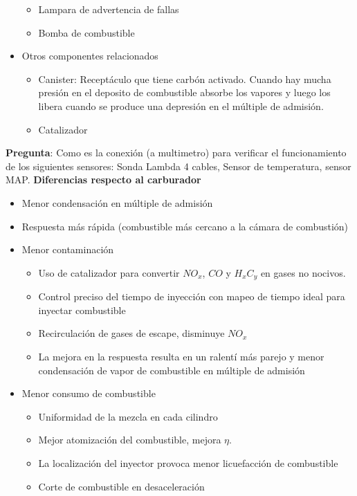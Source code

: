 \begin{itemize}
\begin{itemize}
   \item Lampara de advertencia de fallas
   \item Bomba de combustible
   \end{itemize}
   \item Otros componentes relacionados
   \begin{itemize}
          \item Canister: Receptáculo que tiene carbón activado. Cuando hay mucha presión en el deposito de combustible absorbe los vapores y luego los libera cuando se produce una depresión en el múltiple de admisión.
          \item Catalizador
   \end{itemize}
\end{itemize}

\textbf{Pregunta}: Como es la conexión (a multimetro) para verificar el funcionamiento de los siguientes sensores: Sonda Lambda 4 cables, Sensor de temperatura, sensor MAP.
{\bf Diferencias respecto al carburador}

\begin{itemize}
    \item Menor condensación en múltiple de admisión
    \item Respuesta más rápida (combustible más cercano a la cámara de combustión)
    \item Menor contaminación
    \begin{itemize}
        \item Uso de catalizador para convertir $NO_x$, $CO$ y $H_xC_y$ en gases no nocivos.
        \item Control preciso del tiempo de inyección con mapeo de tiempo ideal para inyectar combustible
        \item Recirculación de gases de escape, disminuye $NO_x$
        \item La mejora en la respuesta resulta en un ralentí más parejo y menor condensación de vapor de combustible en múltiple de admisión
    \end{itemize}
    \item Menor consumo de combustible
    \begin{itemize}
        \item Uniformidad de la mezcla en cada cilindro
        \item Mejor atomización del combustible, mejora $\eta$.
        \item La localización del inyector provoca menor licuefacción de combustible
        \item Corte de combustible en desaceleración
    \end{itemize}
    
\end{itemize}

